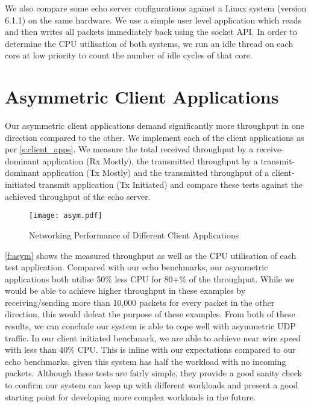 We also compare some echo server configurations against a Linux system (version 6.1.1) on the same hardware. 
We use a simple user level application which reads and then writes all packets immediately back using the socket API. 
In order to determine the CPU utilisation of both systems, we run an idle thread on each core
at low priority to count the number of idle cycles of that core. 

\section{Asymmetric Client Applications}

Our asymmetric client applications demand significantly more throughput in one direction compared to the 
other. We implement each of the client applications as per \autoref{s:client_apps}.
We measure the total received throughput by a receive-dominant application (Rx Mostly), the
transmitted throughput by a transmit-dominant application (Tx Mostly) and the transmitted throughput
of a client-initiated transmit application (Tx Initiated) and compare these tests against the achieved
throughput of the echo server. 

\vspace{0.5cm}
\begin{figure}[h]
    \centering
    \texttt{[image: asym.pdf]}
    \caption{Networking Performance of Different Client Applications}
    \label{f:asym}
\end{figure}

\autoref{f:asym} shows the measured throughput as well as the CPU utilisation of each test application. 
Compared with our echo benchmarks, our asymmetric applications both utilise 50\% less CPU for 80+\% of the
throughput. While we would be able to achieve higher throughput in these examples by receiving/sending
more than 10,000 packets for every packet in the other direction, this would defeat the purpose of these examples.
From both of these results, we can conclude our system is able to cope well with asymmetric UDP traffic. 
In our client initiated benchmark, we are able to achieve near wire speed with less than 40\% CPU. This is inline
with our expectations compared to our echo benchmarks, given this system has half the workload with no incoming
packets. Although these tests are fairly simple, they provide a good sanity check to confirm our system can 
keep up with different workloads and present a good starting point for developing more complex workloads in the future.

